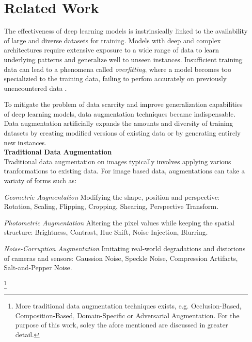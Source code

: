\section{Related Work}\label{related_work}


The effectiveness of deep learning models is instrinsically linked to the availability of large and diverse datasets for training. Models with deep and complex architectures require extensive exposure to a wide range of data to learn underlying patterns and generalize well to unseen instances. Insufficient training data can lead to a phenomena called \textit{overfitting}, where a model becomes too specializied to the training data, failing to perfom accurately on previously unencountered data \cite{Ying2019overfittinganditssolutions}. 

To mitigate the problem of data scarcity and improve generalization capabilities of deep learning models, data augmentation techniques became indispensable. Data augmentation artificially expands the amounts and diversity of training datasets by creating modified versions of existing data or by generating entirely new instances. \\

\textbf{Traditional Data Augmentation}\label{traditional_data_augmentation} \\
Traditional data augmentation on images typically involves applying various tranformations to existing data. For image based data, augmentations can take a variaty of forms such as: 

\textit{Geometric Augmentation}
Modifying the shape, position and perspective: Rotation, Scaling, Flipping, Cropping, Shearing, Perspective Transform.

\textit{Photometric Augmentation}
Altering the pixel values while keeping the spatial structure: Brightness, Contrast, Hue Shift, Noise Injection, Blurring.

\textit{Noise-Corruption Augmentation}
Imitating real-world degradations and distorions of cameras and sensors: Gaussion Noise, Speckle Noise, Compression Artifacts, Salt-and-Pepper Noise.  

\footnote{More traditional data augmentation techniques exists, e.g. Occlusion-Based, Composition-Based, Domain-Specific or Adversarial Augmentation. For the purpose of this work,  soley the afore mentioned are discussed in greater detail.}

